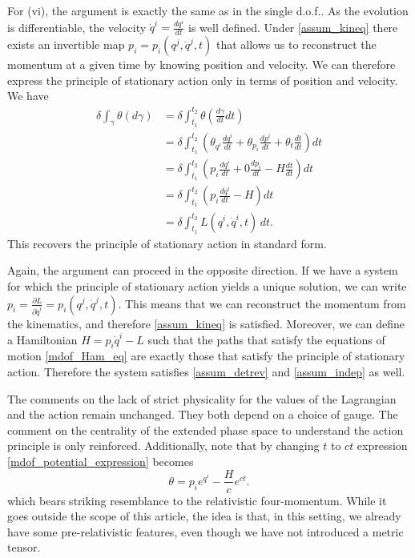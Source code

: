 \documentclass[10pt,twocolumn, nofootinbib]{revtex4-2}
\begin{document}
For (vi), the argument is exactly the same as in the single d.o.f.. As the evolution is differentiable, the velocity $\dot{q}^i = \frac{dq^i}{dt}$ is well defined. Under \ref{assum_kineq} there exists an invertible map $p_i=p_i(q^j, \dot{q}^j, t)$ that allows us to reconstruct the momentum at a given time by knowing position and velocity. We can therefore express the principle of stationary action only in terms of position and velocity. We have
\begin{equation}
	\begin{aligned}
		\delta \int_\gamma \theta (d\gamma) &= \delta \int^{t_2}_{t_1} \theta \left(\frac{d\gamma}{dt} dt\right) \\
		&= \delta \int^{t_2}_{t_1} \left(\theta_{q^i} \frac{dq^i}{dt} + \theta_{p_i} \frac{dp^i}{dt} + \theta_t \frac{dt}{dt}\right) dt \\
		&= \delta\int^{t_2}_{t_1} \left(p_i \frac{dq^i}{dt} + 0 \frac{dp_i}{dt} - H \frac{dt}{dt}\right) dt \\
		&= \delta \int^{t_2}_{t_1} \left(p_i \frac{dq^i}{dt} - H\right) dt \\
		&= \delta \int^{t_2}_{t_1} L(q^i, \dot{q}^i, t) \, dt.
	\end{aligned}
\end{equation}
This recovers the principle of stationary action in standard form.

Again, the argument can proceed in the opposite direction. If we have a system for which the principle of stationary action yields a unique solution, we can write $p_i = \frac{\partial L}{\partial \dot{q}^i} = p_i(q^j, \dot{q}^j, t)$. This means that we can reconstruct the momentum from the kinematics, and therefore \ref{assum_kineq} is satisfied. Moreover, we can define a Hamiltonian $H = p_i \dot{q}^i - L$ such that the paths that satisfy the equations of motion \ref{mdof_Ham_eq} are exactly those that satisfy the principle of stationary action. Therefore the system satisfies \ref{assum_detrev} and \ref{assum_indep} as well.

The comments on the lack of strict physicality for the values of the Lagrangian and the action remain unchanged. They both depend on a choice of gauge. The comment on the centrality of the extended phase space to understand the action principle is only reinforced. Additionally, note that by changing $t$ to $ct$ expression \ref{mdof_potential_expression} becomes
\begin{equation}\label{mdof_potential_relativistic}
	\theta = p_i e^{q^i} - \frac{H}{c} e^{ct}.
\end{equation}
which bears striking resemblance to the relativistic four-momentum. While it goes outside the scope of this article, the idea is that, in this setting, we already have some pre-relativistic features, even though we have not introduced a metric tensor.
\end{document}
